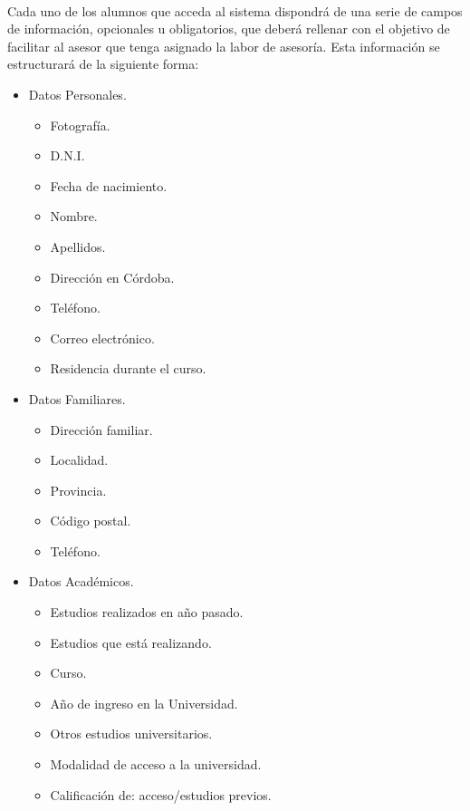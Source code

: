       \paragraph{}Cada uno de los alumnos que acceda al sistema dispondrá
      de una serie de campos de información, opcionales u obligatorios, que
      deberá rellenar con el objetivo de facilitar al asesor que tenga asignado
      la labor de asesoría. Esta información se estructurará de la siguiente
      forma:

      \begin{itemize}
         \item Datos Personales.
         \begin{itemize}
            \item Fotografía.
            \item D.N.I.
            \item Fecha de nacimiento.
            \item Nombre.
            \item Apellidos.
            \item Dirección en Córdoba.
            \item Teléfono.
            \item Correo electrónico.
            \item Residencia durante el curso.
         \end{itemize}
         \item Datos Familiares.
         \begin{itemize}
            \item Dirección familiar.
            \item Localidad.
            \item Provincia.
            \item Código postal.
            \item Teléfono.
         \end{itemize}
         \item Datos Académicos.
         \begin{itemize}
            \item Estudios realizados en año pasado.
            \item Estudios que está realizando.
            \item Curso.
            \item Año de ingreso en la Universidad.
            \item Otros estudios universitarios.
            \item Modalidad de acceso a la universidad.
            \item Calificación de: acceso/estudios previos.
         \end{itemize}
      \end{itemize}

